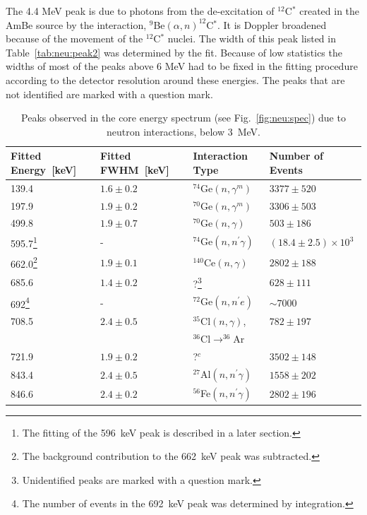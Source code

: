 The 4.4 MeV peak is due to photons from the de-excitation of $^{12}$C$^{*}$ created in the AmBe source by the interaction, $^{9}$Be$(\alpha,n)^{12}$C$^{*}$. It is Doppler broadened because of the movement of the $^{12}$C$^{*}$ nuclei. The width of this peak listed in Table~\ref{tab:neu:peak2} was determined by the fit. Because of low statistics the widths of most of the peaks above 6 MeV had to be fixed in the fitting procedure according to the detector resolution around these energies. The peaks that are not identified are marked with a question mark.

\begin{table}[tbhp]
\centering
\caption{Peaks observed in the core energy spectrum (see Fig.~\ref{fig:neu:spec}) due to neutron interactions, below 3~MeV.} 
\label{tab:neu:peak}
\begin{minipage}{\linewidth}
\begin{tabular*}{\textwidth}{llll} \hline
Fitted Energy~[keV]& Fitted FWHM~[keV]& Interaction Type& Number of Events\\\hline
139.4 & $1.6 \pm 0.2$ & $^{74}$Ge$(n,\gamma^m)$ & $3377 \pm 520$ \\
197.9 & $1.9 \pm 0.2$ & $^{70}$Ge$(n,\gamma^m)$ & $3306 \pm 503$ \\
499.8 & $1.9 \pm 0.7$ & $^{70}$Ge$(n,\gamma)$   & $503  \pm 186$ \\
595.7\footnote{The fitting of the 596~keV peak is described in a later section.} & - & $^{74}$Ge$(n,n^\prime\gamma)$ & $(18.4 \pm 2.5)\times10^3$\\
662.0\footnote{The background contribution to the 662~keV peak was subtracted.} & $1.9 \pm 0.1$ & $^{140}$Ce$(n,\gamma)$ & $2802 \pm 188$ \\
685.6 & $1.4 \pm 0.2$ & ?\footnote{Unidentified peaks are marked with a question mark.} & $628  \pm 111$ \\
692\footnote{The number of events in the 692~keV peak was determined by integration.}  & - & $^{72}$Ge$(n,n^\prime e)$ & $\sim 7000$ \\
708.5  & $2.4 \pm 0.5$ & $^{35}$Cl$(n,\gamma)$,  & $782 \pm 197$ \\
&  & $^{36}$Cl$\rightarrow^{36}$Ar & \\
721.9  & $1.9 \pm 0.2$ & ?$^c$ & $3502 \pm 148$ \\
843.4  & $2.4 \pm 0.5$ & $^{27}$Al$(n,n^\prime\gamma)$ & $1558 \pm 202$ \\
846.6  & $2.4 \pm 0.2$ & $^{56}$Fe$(n,n^\prime\gamma)$ & $2802 \pm 196$ \\

\end{tabular*}
\end{minipage}
\end{table}
